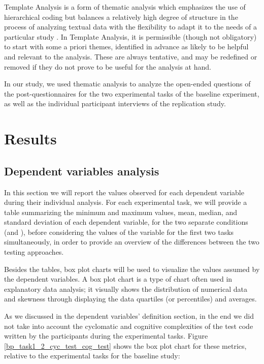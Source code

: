 Template Analysis is a form of thematic analysis which emphasizes the use of hierarchical coding but balances a relatively high degree of structure in the process of analyzing textual data with the flexibility to adapt it to the needs of a particular study \cite{ThematicAnalysis}. In Template Analysis, it is permissible (though not obligatory) to start with some a priori themes, identified in advance as likely to be helpful and relevant to the analysis. These are always tentative, and may be redefined or removed if they do not prove to be useful for the analysis at hand.

In our study, we used thematic analysis to analyze the open-ended questions of the post-questionnaires for the two experimental tasks of the baseline experiment, as well as the individual participant interviews of the replication study.



\section{Results}
\subsection{Dependent variables analysis}
In this section we will report the values observed for each dependent variable during their individual analysis. For each experimental task, we will provide a table summarizing the minimum and maximum values, mean, median, and standard deviation of each dependent variable, for the two separate conditions (\ie \tdd and \notdd), before considering the values of the variable for the first two tasks simultaneously, in order to provide an overview of the differences between the two testing approaches.

Besides the tables, box plot charts will be used to visualize the values assumed by the dependent variables.
A box plot chart is a type of chart often used in explanatory data analysis; it visually shows the distribution of numerical data and skewness through displaying the data quartiles (or percentiles) and averages.


As we discussed in the dependent variables' definition section, in the end we did not take into account the cyclomatic and cognitive complexities of the test code written by the participants during the experimental tasks. 
Figure \ref{bp_task1_2_cyc_test_cog_test} shows the box plot chart for these metrics, relative to the experimental tasks for the baseline study:

